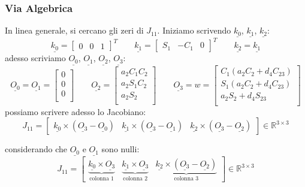\subsubsection{Via Algebrica}
In linea generale, si cercano gli zeri di $J_{11}$. Iniziamo scrivendo $\underline{k_0}$, $\underline{k_1}$, $\underline{k_2}$:
\begin{equation}
	\underline{k_0} =
	\begin{bmatrix}
		0 & 0 & 1
	\end{bmatrix}^{T}
	\qquad \underline{k_1} =
	\begin{bmatrix}
		S_1 & -C_1 & 0
	\end{bmatrix}^{T}
	\qquad \underline{k_2} = \underline{k_1}
\end{equation}
adesso scriviamo $\underline{O_0}$, $\underline{O_1}$, $\underline{O_2}$, $\underline{O_3}$:
\begin{equation}
	\underline{O_0} = \underline{O_1} = 
	\begin{bmatrix}
		0 \\
		0 \\
		0 \\
	\end{bmatrix}
	\qquad \underline{O_2} =
	\begin{bmatrix}
		a_2C_1C_2 \\
		a_2S_1C_2 \\
		a_2S_2 \\
	\end{bmatrix}
	\qquad \underline{O_3} = w = 
	\begin{bmatrix}
		C_1(a_2C_2 + d_4C_{23}) \\
		S_1(a_2C_2 + d_4C_{23}) \\
		a_2S_2 + d_4S_{23} \\
	\end{bmatrix}
\end{equation}
possiamo scrivere adesso lo Jacobiano:
\begin{equation*}
	J_{11} = 
	\begin{bmatrix}
		\underline{k_0} \times (\underline{O_3} - \underline{O_0}) & \underline{k_1} \times (\underline{O_3} - \underline{O_1}) & \underline{k_2} \times (\underline{O_3} - \underline{O_2})
	\end{bmatrix}\in\mathbb{R}^{3 \times 3}
\end{equation*}

considerando che $\underline{O_0}$ e $\underline{O_1}$ sono nulli:
\begin{equation}
	J_{11} = 
	\begin{bmatrix}
		\underbrace{\underline{k_0} \times \underline{O_3}}_{\text{colonna 1}} & \underbrace{\underline{k_1} \times \underline{O_3}}_{\text{colonna 2}} & \underbrace{\underline{k_2} \times (\underline{O_3} - \underline{O_2})}_{\text{colonna 3}}
	\end{bmatrix}\in\mathbb{R}^{3 \times 3}
\end{equation}
